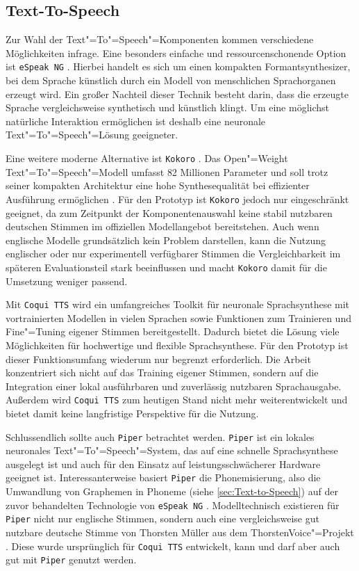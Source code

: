 \subsection{Text-To-Speech}
\label{subsec:Text_To_Speech}Zur Wahl der Text"=To"=Speech"=Komponenten kommen verschiedene Möglichkeiten infrage. Eine besonders einfache und ressourcenschonende Option ist \texttt{eSpeak NG} \autocite{ESpeakNG-Documentation}. Hierbei handelt es sich um einen kompakten Formantsynthesizer, bei dem Sprache künstlich durch ein Modell von menschlichen Sprachorganen erzeugt wird. Ein großer Nachteil dieser Technik besteht darin, dass die erzeugte Sprache vergleichsweise synthetisch und künstlich klingt. Um eine möglichst natürliche Interaktion ermöglichen ist deshalb eine neuronale Text"=To"=Speech"=Lösung geeigneter.

Eine weitere moderne Alternative ist \texttt{Kokoro} \autocite{Kokoro-Documentation}. Das Open"=Weight Text"=To"=Speech"=Modell umfasst 82 Millionen Parameter und soll trotz seiner kompakten Architektur eine hohe Synthesequalität bei effizienter Ausführung ermöglichen \autocite{Kokoro-Documentation}. Für den Prototyp ist \texttt{Kokoro} jedoch nur eingeschränkt geeignet, da zum Zeitpunkt der Komponentenauswahl keine stabil nutzbaren deutschen Stimmen im offiziellen Modellangebot bereitstehen. Auch wenn englische Modelle grundsätzlich kein Problem darstellen, kann die Nutzung englischer oder nur experimentell verfügbarer Stimmen die Vergleichbarkeit im späteren Evaluationsteil stark beeinflussen und macht \texttt{Kokoro} damit für die Umsetzung weniger passend.

Mit \texttt{Coqui TTS} \autocite{CoquiTTS-Documentation} wird ein umfangreiches Toolkit für neuronale Sprachsynthese mit vortrainierten Modellen in vielen Sprachen sowie Funktionen zum Trainieren und Fine"=Tuning eigener Stimmen bereitgestellt. Dadurch bietet die Lösung viele Möglichkeiten für hochwertige und flexible Sprachsynthese. Für den Prototyp ist dieser Funktionsumfang wiederum nur begrenzt erforderlich. Die Arbeit konzentriert sich nicht auf das Training eigener Stimmen, sondern auf die Integration einer lokal ausführbaren und zuverlässig nutzbaren Sprachausgabe. Außerdem wird \texttt{Coqui TTS} zum heutigen Stand nicht mehr weiterentwickelt und bietet damit keine langfristige Perspektive für die Nutzung.

Schlussendlich sollte auch \texttt{Piper} \autocite{Piper-Documentation} betrachtet werden. \texttt{Piper} ist ein lokales neuronales Text"=To"=Speech"=System, das auf eine schnelle Sprachsynthese ausgelegt ist und auch für den Einsatz auf leistungsschwächerer Hardware geeignet ist. Interessanterweise basiert \texttt{Piper} die Phonemisierung, also die Umwandlung von Graphemen in Phoneme (siehe \autoref{sec:Text-to-Speech}) auf der zuvor behandelten Technologie von \texttt{eSpeak NG} \autocite{Piper-Documentation}. Modelltechnisch existieren für \texttt{Piper} nicht nur englische Stimmen, sondern auch eine vergleichsweise gut nutzbare deutsche Stimme von Thorsten Müller aus dem ThorstenVoice"=Projekt \autocite{ThorstenVoice-Documentation}. Diese wurde ursprünglich für \texttt{Coqui TTS} entwickelt, kann und darf aber auch gut mit \texttt{Piper} genutzt werden.

